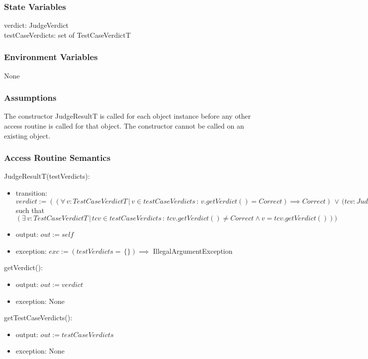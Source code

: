 \documentclass[12pt, titlepage]{article}
\begin{document}
\subsubsection{State Variables}

verdict: JudgeVerdict\\
testCaseVerdicts: set of TestCaseVerdictT

\subsubsection{Environment Variables}

None

\subsubsection{Assumptions}

The constructor JudgeResultT is called for each object instance before any other access routine is called for that object. The constructor cannot be called on an existing object.

\subsubsection{Access Routine Semantics}

\noindent JudgeResultT(testVerdicts):
\begin{itemize}
\item transition: $verdict := ((\forall\, v: TestCaseVerdictT \,|\, v \in testCaseVerdicts \,:\, v.getVerdict() = Correct) \implies Correct) \, \lor \, (tcv: JudgeVerdict$ such that $(\exists\, v: TestCaseVerdictT \,|\, tcv \in testCaseVerdicts \,:\, tcv.getVerdict() \neq Correct \land v = tcv.getVerdict()))$ 
\item output: $out := self$
\item exception: $exc := (testVerdicts = \, \{\}) \implies$ IllegalArgumentException 
\end{itemize}

\noindent getVerdict():
\begin{itemize}
\item output: $out := verdict$
\item exception: None
\end{itemize}

\noindent getTestCaseVerdicts():
\begin{itemize}
\item output: $out := testCaseVerdicts$
\item exception: None
\end{itemize}
\end{document}

